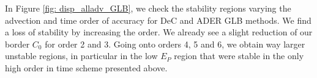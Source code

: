 


In Figure \ref{fig: disp_alladv_GLB}, we check the stability regions varying the advection and time order of accuracy for DeC and ADER GLB methods. 
We find a loss of stability by increasing the order. We already see a slight reduction of our border $C_0$ for order 2 and 3. Going onto orders 4, 5 and 6, we obtain way larger unstable regions, in particular in the low $E_P$ region that were stable in the only high order in time scheme presented above.


